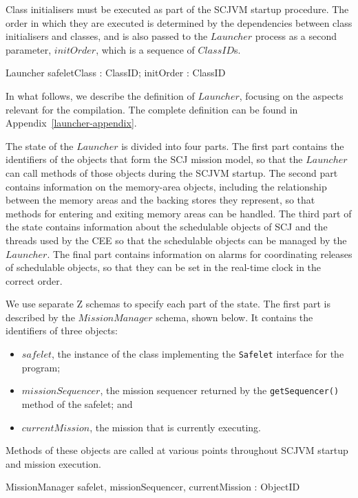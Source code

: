 Class initialisers must be executed as part of the SCJVM startup
procedure.
The order in which they are executed is determined by the dependencies
between class initialisers and classes, and is also passed to the
$Launcher$ process as a second parameter, $initOrder$, which is a
sequence of $ClassID$s.
\begin{circus}
  \circprocess Launcher \circdef safeletClass : ClassID; initOrder : \seq ClassID \circspot \circbegin
\end{circus}

In what follows, we describe the definition of $Launcher$, focusing on
the aspects relevant for the compilation.
The complete definition can be found in
Appendix~\ref{launcher-appendix}.

The state of the $Launcher$ is divided into four parts.
The first part contains the identifiers of the objects that form the
SCJ mission model, so that the $Launcher$ can call methods of those
objects during the SCJVM startup.
The second part contains information on the memory-area objects,
including the relationship between the memory areas and the backing
stores they represent, so that methods for entering and exiting memory
areas can be handled.
The third part of the state contains information about the schedulable
objects of SCJ and the threads used by the CEE so that the schedulable
objects can be managed by the $Launcher$.
The final part contains information on alarms for coordinating
releases of schedulable objects, so that they can be set in the
real-time clock in the correct order.

We use separate Z schemas to specify each part of the state.
The first part is described by the $MissionManager$ schema, shown
below.
It contains the identifiers of three objects:
\begin{itemize}
\item $safelet$, the instance of the class implementing the
  \texttt{Safelet} interface for the program;
\item $missionSequencer$, the mission sequencer returned by the
  \texttt{getSequencer()} method of the safelet; and
\item $currentMission$, the mission that is currently executing.
\end{itemize}
Methods of these objects are called at various points throughout SCJVM
startup and mission execution.
\begin{schema}{MissionManager}
  safelet, missionSequencer, currentMission : ObjectID
\end{schema}

